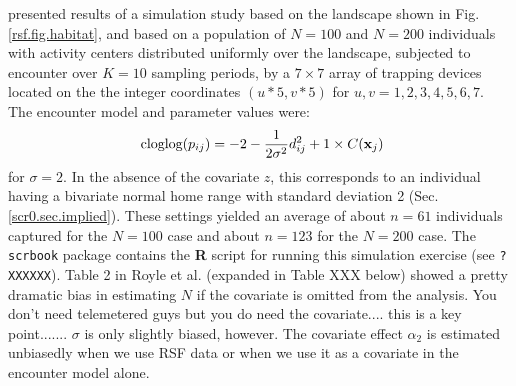 \citet{royle_etal:2012mee} presented results of a simulation study
based on the landscape shown in Fig. \ref{rsf.fig.habitat}, and based
on a population of $N=100$ and $N=200$ individuals with activity
centers distributed uniformly over the landscape, subjected to
encounter over $K=10$ sampling periods, by a $7 \times 7$ array of
trapping devices located on the the integer coordinates $(u*5,v*5)$
for $u,v = 1,2,3,4,5,6,7$. The encounter model and parameter values
were:
\[
\mbox{ cloglog}(p_{ij}) = -2  -\frac{1}{2\sigma^{2}} d_{ij}^{2} + 1 \times C({\bf x}_{j})
\]
for $\sigma =2$. In the absence of the covariate $z$, this corresponds
to an individual having a bivariate normal home range with standard
deviation 2 (Sec. \ref{scr0.sec.implied}).
These settings yielded an average of about $n=61$ individuals captured for
the $N=100$ case and about $n=123$ for the $N=200$ case. The \mbox{\tt
  scrbook} package contains the {\bf R} script for running this
simulation exercise (see \mbox{\tt ? XXXXXX}). Table 2 in Royle et
al. (expanded in Table XXX below) showed a pretty dramatic bias in estimating $N$ if the covariate
is omitted from the analysis. You don't need telemetered guys but you
do need the covariate.... this is a key point.......  $\sigma$ is only
slightly biased, however. The covariate effect $\alpha_{2}$ is
estimated unbiasedly when we use RSF data or when we use it as a
covariate in the encounter model alone. 

